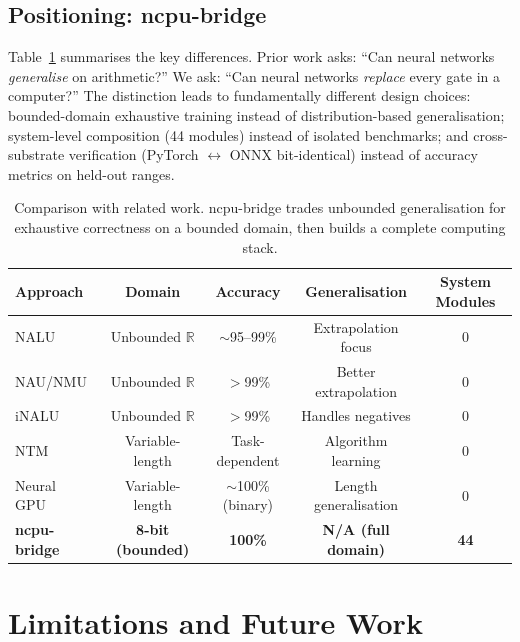 \documentclass[11pt,a4paper]{article}
\begin{document}
\subsection{Positioning: ncpu-bridge}

Table~\ref{tab:comparison} summarises the key differences. Prior work asks: ``Can neural networks \emph{generalise} on arithmetic?'' We ask: ``Can neural networks \emph{replace} every gate in a computer?'' The distinction leads to fundamentally different design choices: bounded-domain exhaustive training instead of distribution-based generalisation; system-level composition (44 modules) instead of isolated benchmarks; and cross-substrate verification (PyTorch $\leftrightarrow$ ONNX bit-identical) instead of accuracy metrics on held-out ranges.

\begin{table}[h]
\centering
\small
\begin{tabular}{lcccc}
\toprule
\textbf{Approach} & \textbf{Domain} & \textbf{Accuracy} & \textbf{Generalisation} & \textbf{System Modules} \\
\midrule
NALU~\cite{trask2018nalu} & Unbounded $\mathbb{R}$ & $\sim$95--99\% & Extrapolation focus & 0 \\
NAU/NMU~\cite{madsen2020nau} & Unbounded $\mathbb{R}$ & $>$99\% & Better extrapolation & 0 \\
iNALU~\cite{schlor2020inalu} & Unbounded $\mathbb{R}$ & $>$99\% & Handles negatives & 0 \\
NTM~\cite{graves2014ntm} & Variable-length & Task-dependent & Algorithm learning & 0 \\
Neural GPU~\cite{kaiser2015neuralgpu} & Variable-length & $\sim$100\% (binary) & Length generalisation & 0 \\
\midrule
\textbf{ncpu-bridge} & \textbf{8-bit (bounded)} & \textbf{100\%} & \textbf{N/A (full domain)} & \textbf{44} \\
\bottomrule
\end{tabular}
\caption{Comparison with related work. ncpu-bridge trades unbounded generalisation for exhaustive correctness on a bounded domain, then builds a complete computing stack.}
\label{tab:comparison}
\end{table}

\section{Limitations and Future Work}
\end{document}
